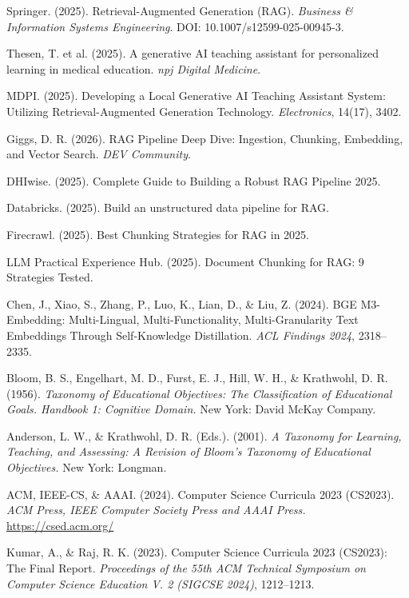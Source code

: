 \documentclass[12pt,A4]{report}
\begin{document}
\begin{thebibliography}{}
Springer. (2025).
Retrieval-Augmented Generation (RAG).
\textit{Business \& Information Systems Engineering}.
DOI: 10.1007/s12599-025-00945-3.

Thesen, T. et al. (2025).
A generative AI teaching assistant for personalized learning in medical education.
\textit{npj Digital Medicine}.

MDPI. (2025).
Developing a Local Generative AI Teaching Assistant System: Utilizing Retrieval-Augmented Generation Technology.
\textit{Electronics}, 14(17), 3402.

Giggs, D. R. (2026).
RAG Pipeline Deep Dive: Ingestion, Chunking, Embedding, and Vector Search.
\textit{DEV Community}.

DHIwise. (2025).
Complete Guide to Building a Robust RAG Pipeline 2025.

Databricks. (2025).
Build an unstructured data pipeline for RAG.

Firecrawl. (2025).
Best Chunking Strategies for RAG in 2025.

LLM Practical Experience Hub. (2025).
Document Chunking for RAG: 9 Strategies Tested.

Chen, J., Xiao, S., Zhang, P., Luo, K., Lian, D., \& Liu, Z. (2024).
BGE M3-Embedding: Multi-Lingual, Multi-Functionality, Multi-Granularity Text Embeddings Through Self-Knowledge Distillation.
\textit{ACL Findings 2024}, 2318--2335.

Bloom, B. S., Engelhart, M. D., Furst, E. J., Hill, W. H., \& Krathwohl, D. R. (1956).
\textit{Taxonomy of Educational Objectives: The Classification of Educational Goals. Handbook 1: Cognitive Domain.}
New York: David McKay Company.

Anderson, L. W., \& Krathwohl, D. R. (Eds.). (2001).
\textit{A Taxonomy for Learning, Teaching, and Assessing: A Revision of Bloom's Taxonomy of Educational Objectives.}
New York: Longman.

ACM, IEEE-CS, \& AAAI. (2024).
Computer Science Curricula 2023 (CS2023).
\textit{ACM Press, IEEE Computer Society Press and AAAI Press.}
\url{https://csed.acm.org/}

Kumar, A., \& Raj, R. K. (2023).
Computer Science Curricula 2023 (CS2023): The Final Report.
\textit{Proceedings of the 55th ACM Technical Symposium on Computer Science Education V. 2 (SIGCSE 2024)}, 1212--1213.


\end{thebibliography}
\end{document}
